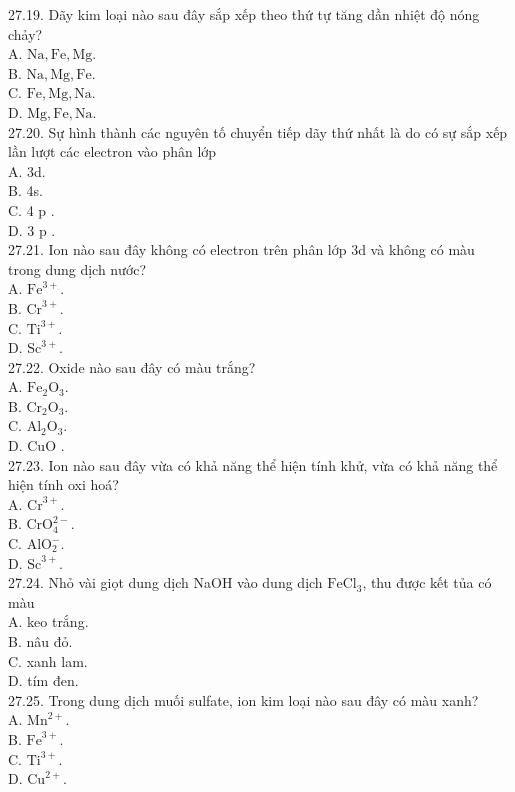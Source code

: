 \documentclass[10pt]{article}
\begin{document}
27.19. Dãy kim loại nào sau đây sắp xếp theo thứ tự tăng dần nhiệt độ nóng chảy?\\
A. $\mathrm{Na}, \mathrm{Fe}, \mathrm{Mg}$.\\
B. $\mathrm{Na}, \mathrm{Mg}, \mathrm{Fe}$.\\
C. $\mathrm{Fe}, \mathrm{Mg}, \mathrm{Na}$.\\
D. $\mathrm{Mg}, \mathrm{Fe}, \mathrm{Na}$.\\
27.20. Sự hình thành các nguyên tố chuyển tiếp dãy thứ nhất là do có sự sắp xếp lần lượt các electron vào phân lớp\\
A. 3d.\\
B. 4s.\\
C. 4 p .\\
D. 3 p .\\
27.21. Ion nào sau đây không có electron trên phân lớp 3d và không có màu trong dung dịch nước?\\
A. $\mathrm{Fe}^{3+}$.\\
B. $\mathrm{Cr}^{3+}$.\\
C. $\mathrm{Ti}^{3+}$.\\
D. $\mathrm{Sc}^{3+}$.\\
27.22. Oxide nào sau đây có màu trắng?\\
A. $\mathrm{Fe}_{2} \mathrm{O}_{3}$.\\
B. $\mathrm{Cr}_{2} \mathrm{O}_{3}$.\\
C. $\mathrm{Al}_{2} \mathrm{O}_{3}$.\\
D. CuO .\\
27.23. Ion nào sau đây vừa có khả năng thể hiện tính khử, vừa có khả năng thể hiện tính oxi hoá?\\
A. $\mathrm{Cr}^{3+}$.\\
B. $\mathrm{CrO}_{4}^{2-}$.\\
C. $\mathrm{AlO}_{2}^{-}$.\\
D. $\mathrm{Sc}^{3+}$.\\
27.24. Nhỏ vài giọt dung dịch NaOH vào dung dịch $\mathrm{FeCl}_{3}$, thu được kết tủa có màu\\
A. keo trắng.\\
B. nâu đỏ.\\
C. xanh lam.\\
D. tím đen.\\
27.25. Trong dung dịch muối sulfate, ion kim loại nào sau đây có màu xanh?\\
A. $\mathrm{Mn}^{2+}$.\\
B. $\mathrm{Fe}^{3+}$.\\
C. $\mathrm{Ti}^{3+}$.\\
D. $\mathrm{Cu}^{2+}$.
\end{document}
